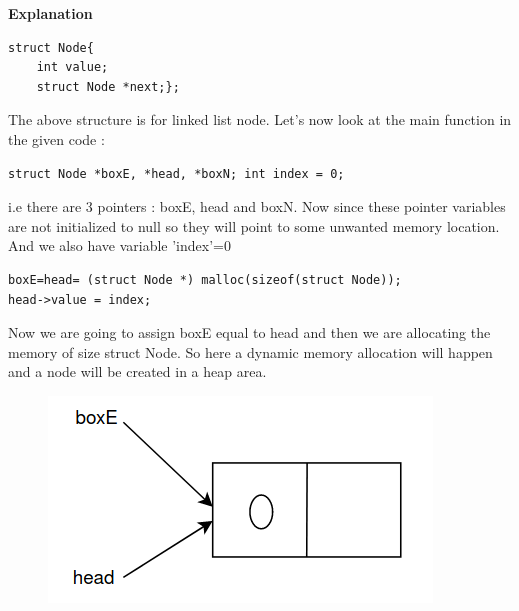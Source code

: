 \documentclass[journal,12pt,twocolumn]{IEEEtran}
\begin{document}
\textbf{Explanation}
\begin{lstlisting}
struct Node{
	int value;
	struct Node *next;};
\end{lstlisting}
	The above structure is for linked list node.
Let's now look at the main function in the given code :
\begin{lstlisting}
struct Node *boxE, *head, *boxN; int index = 0;
\end{lstlisting}
i.e there are 3 pointers : boxE, head and boxN. Now since these pointer variables are not initialized to null so they will point to some unwanted memory location. And we also have variable 'index'=0
\newline
\begin{lstlisting}
boxE=head= (struct Node *) malloc(sizeof(struct Node));
head->value = index;
\end{lstlisting}
Now we are going to assign boxE equal to head and then we are allocating the memory of size struct Node. So here a dynamic memory allocation will happen and a node will be created in a heap area.
\begin{figure}[!h]
	\centering
	\includegraphics[width=\columnwidth]{./figs/1.png}
\end{figure}
\end{document}
